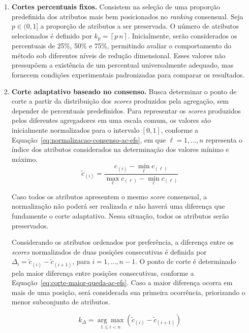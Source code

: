 \begin{enumerate}
    \item \textbf{Cortes percentuais fixos.} Consistem na seleção de uma proporção predefinida dos atributos mais bem posicionados no \textit{ranking} consensual. Seja $p\in(0,1]$ a proporção de atributos a ser preservada. O número de atributos selecionados é definido por $k_p=\left\lceil p\,n\right\rceil$. Inicialmente, serão considerados os percentuais de 25\%, 50\% e 75\%, permitindo avaliar o comportamento do método sob diferentes níveis de redução dimensional. Esses valores não pressupõem a existência de um percentual universalmente adequado, mas fornecem condições experimentais padronizadas para comparar os resultados.

    \item \textbf{Corte adaptativo baseado no consenso.} Busca determinar o ponto de corte a partir da distribuição dos \textit{scores} produzidos pela agregação, sem depender de percentuais predefinidos. Para representar os \textit{scores} produzidos pelos diferentes agregadores em uma escala comum, os valores são inicialmente normalizados para o intervalo $[0,1]$, conforme a Equação~\ref{eq:normalizacao-consenso-ac-efs}, em que $\ell=1,\ldots,n$ representa o índice dos atributos considerados na determinação dos valores mínimo e máximo.
    \begin{equation}\label{eq:normalizacao-consenso-ac-efs}
        \tilde{c}_{(i)}
        =
        \frac{
            c_{(i)}-\min_{\ell}c_{(\ell)}
        }{
            \max_{\ell}c_{(\ell)}
            -
            \min_{\ell}c_{(\ell)}
        }
    \end{equation}

    Caso todos os atributos apresentem o mesmo \textit{score} consensual, a normalização não poderá ser realizada e não haverá uma diferença que fundamente o corte adaptativo. Nessa situação, todos os atributos serão preservados.
    
    Considerando os atributos ordenados por preferência, a diferença entre os \textit{scores} normalizados de duas posições consecutivas é definida por $\Delta_i=\tilde{c}_{(i)}-\tilde{c}_{(i+1)}$, para $i=1,\ldots,n-1$. O ponto de corte é determinado pela maior diferença entre posições consecutivas, conforme a Equação~\ref{eq:corte-maior-queda-ac-efs}. Caso a maior diferença ocorra em mais de uma posição, será considerada sua primeira ocorrência, priorizando o menor subconjunto de atributos.

    \begin{equation}
        k_{\Delta}
        =
        \underset{1\leq i<n}{\arg\max}
        \left(
            \tilde{c}_{(i)}-\tilde{c}_{(i+1)}
        \right)
        \label{eq:corte-maior-queda-ac-efs}
    \end{equation}
    

\end{enumerate}
